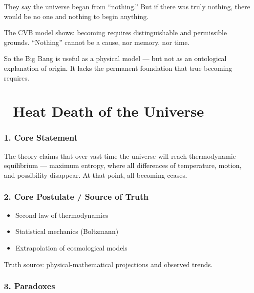 \documentclass[12pt]{article}
\begin{document}
They say the universe began from ``nothing.'' But if there was truly nothing, there would be no one and nothing to begin anything.

The CVB model shows: becoming requires distinguishable and permissible grounds. ``Nothing'' cannot be a cause, nor memory, nor time.

So the Big Bang is useful as a physical model — but not as an ontological explanation of origin. It lacks the permanent foundation that true becoming requires.

\section*{🔷 Heat Death of the Universe}

\subsubsection*{1. Core Statement}

The theory claims that over vast time the universe will reach thermodynamic equilibrium — maximum entropy, where all differences of temperature, motion, and possibility disappear. At that point, all becoming ceases.

\subsubsection*{2. Core Postulate / Source of Truth}

\begin{itemize}
\item Second law of thermodynamics
\item Statistical mechanics (Boltzmann)
\item Extrapolation of cosmological models
\end{itemize}

Truth source: physical-mathematical projections and observed trends.

\subsubsection*{3. Paradoxes}
\end{document}
